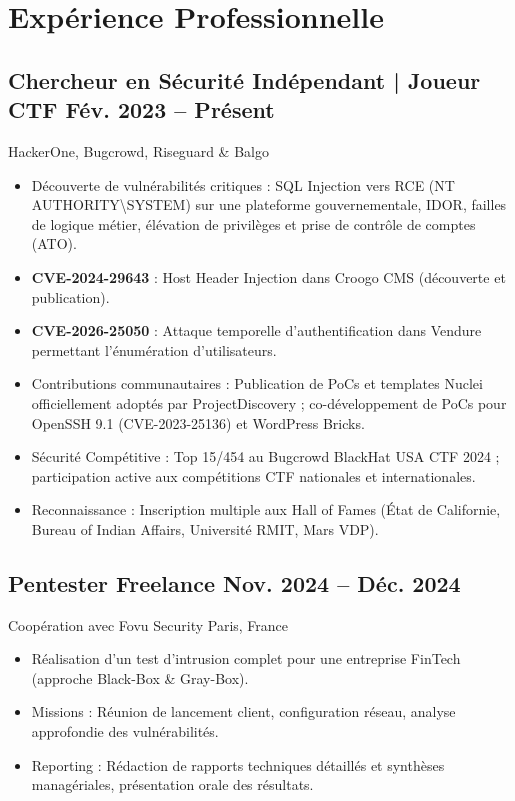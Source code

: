 \documentclass[a4paper,10pt]{article}
\newcommand{\subtext}[1]{#1\par\vspace{-0.2cm}}
\newenvironment{zitemize}{
    \begin{itemize}[leftmargin=*, labelsep=0.5em, itemsep=0pt, parsep=1pt]
}{\end{itemize}\vspace{-0.2cm}}
\begin{document}
\section{Expérience Professionnelle}

\subsection*{Chercheur en Sécurité Indépendant | Joueur CTF \hfill Fév. 2023 -- Présent} 
\subtext{HackerOne, Bugcrowd, Riseguard \& Balgo} 
\begin{zitemize}
    \item Découverte de vulnérabilités critiques : SQL Injection vers RCE (NT AUTHORITY\textbackslash SYSTEM) sur une plateforme gouvernementale, IDOR, failles de logique métier, élévation de privilèges et prise de contrôle de comptes (ATO).
    \item \textbf{CVE-2024-29643} : Host Header Injection dans Croogo CMS (découverte et publication).
    \item \textbf{CVE-2026-25050} : Attaque temporelle d'authentification dans Vendure permettant l'énumération d'utilisateurs.
    \item Contributions communautaires : Publication de PoCs et templates Nuclei officiellement adoptés par ProjectDiscovery ; co-développement de PoCs pour OpenSSH 9.1 (CVE-2023-25136) et WordPress Bricks.
    \item Sécurité Compétitive : Top 15/454 au Bugcrowd BlackHat USA CTF 2024 ; participation active aux compétitions CTF nationales et internationales.
    \item Reconnaissance : Inscription multiple aux Hall of Fames (État de Californie, Bureau of Indian Affairs, Université RMIT, Mars VDP).
\end{zitemize}

\subsection*{Pentester Freelance \hfill Nov. 2024 -- Déc. 2024} 
\subtext{Coopération avec Fovu Security \hfill Paris, France} 
\begin{zitemize}
    \item Réalisation d'un test d'intrusion complet pour une entreprise FinTech (approche Black-Box \& Gray-Box).
    \item Missions : Réunion de lancement client, configuration réseau, analyse approfondie des vulnérabilités.
    \item Reporting : Rédaction de rapports techniques détaillés et synthèses managériales, présentation orale des résultats.
\end{zitemize}
\end{document}
